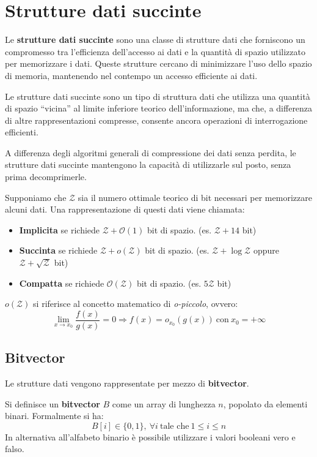 \chapter{Strutture dati succinte}
Le \textbf{strutture dati succinte} sono una classe di strutture dati che forniscono un compromesso tra l’efficienza dell’accesso ai dati e la quantità di spazio utilizzato per memorizzare i dati. Queste strutture cercano di minimizzare l’uso dello spazio di memoria, mantenendo nel contempo un accesso efficiente ai dati.

Le strutture dati succinte sono un tipo di struttura dati che utilizza una quantità di spazio “vicina” al limite inferiore teorico dell’informazione, ma che, a differenza di altre rappresentazioni compresse, consente ancora operazioni di interrogazione efficienti.

A differenza degli algoritmi generali di compressione dei dati senza perdita, le strutture dati succinte mantengono la capacità di utilizzarle sul posto, senza prima decomprimerle.

Supponiamo che $\mathcal{Z}$ sia il numero ottimale teorico di bit necessari per memorizzare alcuni dati. Una rappresentazione di questi dati viene chiamata:
\begin{itemize}
    \item \textbf{Implicita} se richiede $\mathcal{Z} + \mathcal{O}(1)$ bit di spazio. (es. $\mathcal{Z} + 14$ bit) 
    \item \textbf{Succinta} se richiede $\mathcal{Z} + o(\mathcal{Z})$ bit di spazio. (es. $\mathcal{Z} + \log \mathcal{Z}$ oppure $\mathcal{Z} + \sqrt{\mathcal{Z}}$ bit)
    \item \textbf{Compatta} se richiede $\mathcal{O}(\mathcal{Z})$ bit di spazio. (es. $5\mathcal{Z}$ bit)
\end{itemize}
\begin{nota}
    $o(\mathcal{Z})$ si riferisce al concetto matematico di \textit{o-piccolo}, ovvero:
    \begin{equation}
        \lim_{x \to x_0} \frac{f(x)}{g(x)} = 0 \Rightarrow f(x) = o_{x_0} (g(x)) \ \text{con} \ x_0 = + \infty
    \end{equation}
\end{nota}
\section{Bitvector}
Le strutture dati vengono rappresentate per mezzo di \textbf{bitvector}.
\begin{definizione}
    Si definisce un \textbf{bitvector} $B$ come un array di lunghezza $n$, popolato da elementi binari. Formalmente si ha:
    \begin{equation}
        B[i] \in \{0, 1\}, \ \forall i \ \text{tale che} \ 1 \leq i \leq n
    \end{equation}
    In alternativa all'alfabeto binario è possibile utilizzare i valori booleani vero e falso.
\end{definizione}

